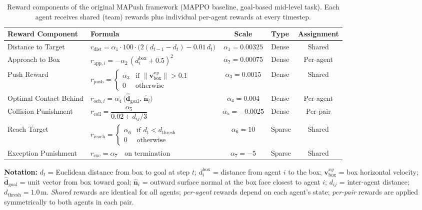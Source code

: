 \begin{table}[t]
\centering
\caption{Reward components of the original MAPush framework (MAPPO baseline, goal-based mid-level task). Each agent receives shared (team) rewards plus individual per-agent rewards at every timestep.}
\label{tab:baseline_rewards}
\begin{tabular}{@{}llclc@{}}
\toprule
\textbf{Reward Component} & \textbf{Formula} & \textbf{Scale} & \textbf{Type} & \textbf{Assignment} \\
\midrule

Distance to Target &
$r_{\text{dist}} = \alpha_1 \cdot 100 \cdot \bigl(2(d_{t-1} - d_t) - 0.01 \, d_t\bigr)$ &
$\alpha_1 = 0.00325$ &
Dense &
Shared \\[4pt]

Approach to Box &
$r_{\text{app},i} = -\alpha_2 \, (d_i^{\text{box}} + 0.5)^2$ &
$\alpha_2 = 0.00075$ &
Dense &
Per-agent \\[4pt]

Push Reward &
$r_{\text{push}} = \begin{cases} \alpha_3 & \text{if } \|\mathbf{v}_{\text{box}}^{xy}\| > 0.1 \\ 0 & \text{otherwise} \end{cases}$ &
$\alpha_3 = 0.0015$ &
Dense &
Shared \\[4pt]

Optimal Contact Behind &
$r_{\text{ocb},i} = \alpha_4 \, \langle \hat{\mathbf{d}}_{\text{goal}},\, \hat{\mathbf{n}}_i \rangle$ &
$\alpha_4 = 0.004$ &
Dense &
Per-agent \\[4pt]

Collision Punishment &
$r_{\text{coll}} = \dfrac{\alpha_5}{0.02 + d_{ij}/3}$ &
$\alpha_5 = -0.0025$ &
Dense &
Per-pair \\[6pt]

Reach Target &
$r_{\text{reach}} = \begin{cases} \alpha_6 & \text{if } d_t < d_{\text{thresh}} \\ 0 & \text{otherwise} \end{cases}$ &
$\alpha_6 = 10$ &
Sparse &
Shared \\[4pt]

Exception Punishment &
$r_{\text{exc}} = \alpha_7 \quad \text{on termination}$ &
$\alpha_7 = -5$ &
Sparse &
Shared \\

\bottomrule
\end{tabular}

\vspace{6pt}
\footnotesize
\textbf{Notation:}
$d_t$ = Euclidean distance from box to goal at step $t$;
$d_i^{\text{box}}$ = distance from agent $i$ to the box;
$\mathbf{v}_{\text{box}}^{xy}$ = box horizontal velocity;
$\hat{\mathbf{d}}_{\text{goal}}$ = unit vector from box toward goal;
$\hat{\mathbf{n}}_i$ = outward surface normal at the box face closest to agent $i$;
$d_{ij}$ = inter-agent distance;
$d_{\text{thresh}} = 1.0\,\text{m}$.
\textit{Shared} rewards are identical for all agents; \textit{per-agent} rewards depend on each agent's state; \textit{per-pair} rewards are applied symmetrically to both agents in each pair.
\end{table}

